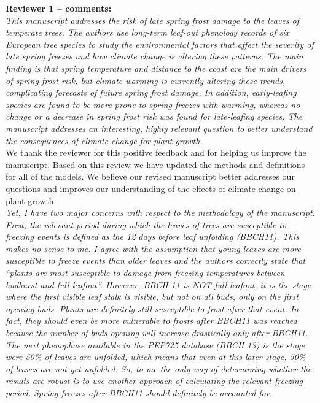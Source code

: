 \documentclass[11pt,a4paper]{article}\usepackage[]{graphicx}\usepackage[]{color}
\begin{document}
\textbf {Reviewer 1 -- comments:} \\

\textit{This manuscript addresses the risk of late spring frost damage to the leaves of temperate trees. The authors use long-term leaf-out phenology records of six European tree species to study the environmental factors that affect the severity of late spring freezes and how climate change is altering these patterns. The main finding is that spring temperature and distance to the coast are the main drivers of spring frost risk, but climate warming is currently altering these trends, complicating forecasts of future spring frost damage. In addition, early-leafing species are found to be more prone to spring freezes with warming, whereas no change or a decrease in spring frost risk was found for late-leafing species. The manuscript addresses an interesting, highly relevant question to better understand the consequences of climate change for plant growth.}\\

We thank the reviewer for this positive feedback and for helping us improve the manuscript. Based on this review we have updated the methods and definitions for all of the models. We believe our revised manuscript better addresses our questions and improves our understanding of the effects of climate change on plant growth.\\

\textit{Yet, I have two major concerns with respect to the methodology of the manuscript.
First, the relevant period during which the leaves of trees are susceptible to freezing events is defined as the 12 days before leaf unfolding (BBCH11). This makes no sense to me. I agree with the assumption that young leaves are more susceptible to freeze events than older leaves and the authors correctly state that ``plants are most susceptible to
damage from freezing temperatures between budburst and full leafout''. However, BBCH 11 is NOT full leafout, it is the stage where the first visible leaf stalk is visible, but not on all buds, only on the first opening buds. Plants are definitely still susceptible to frost after that event. In fact, they should even be more vulnerable to frosts after BBCH11 was reached because the number of buds opening will increase drastically only after BBCH11. The next phenophase available in the PEP725 database (BBCH 13) is the stage were 50\% of leaves are unfolded, which means that even at this later stage, 50\% of leaves are not yet unfolded. So, to me the only way of determining whether the results are robust is to use another approach of calculating the relevant freezing period. Spring freezes after BBCH11 should definitely be accounted for.} \\
\end{document}
